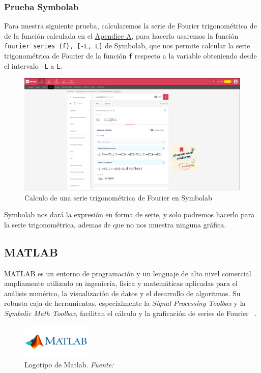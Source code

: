 \subsubsection{Prueba Symbolab}
Para nuestra siguiente prueba, calcularemos la serie de Fourier trigonométrica de de la función calculada en el \hyperref[app1:trig-coeff]{Apendice A}, para hacerlo usaremos la función \texttt{fourier series (f), [-L, L]} de Symbolab, que nos permite calcular la serie trigonométrica de Fourier de la función \texttt{f} respecto a la variable obteniendo desde el intervalo \texttt{-L} a \texttt{L}.
\begin{figure}[H]
	\centering
	\includegraphics[width=1\textwidth]{img/chapter02/symbolab-trig-series.png}
	\caption{Calculo de una serie trigonométrica de Fourier en Symbolab}
	\label{fig:symbolab-trig-series}  %
\end{figure}
Symbolab nos dará la expresión en forma de serie, y solo podremos hacerlo para la serie trigonométrica, ademas de que no nos muestra ninguna gráfica.

\subsection{MATLAB} 
MATLAB es un entorno de programación y un lenguaje de alto nivel comercial ampliamente utilizado en ingeniería, física y matemáticas aplicadas para el análisis numérico, la visualización de datos y el desarrollo de algoritmos. Su robusta caja de herramientas, especialmente la \textit{Signal Processing Toolbox} y la \textit{Symbolic Math Toolbox}, facilitan el cálculo y la graficación de series de Fourier  ~\cite{MathWorks2024}.

\begin{figure}[H]
	\centering
	\includegraphics[width=0.3\textwidth]{img/chapter02/logo_matlab.png}
	\caption[Logotipo de Matlab.]{Logotipo de Matlab. \textit{Fuente: ~\cite{MathWorks2024}}}
	\label{fig:logo-matlab}  %
\end{figure}

